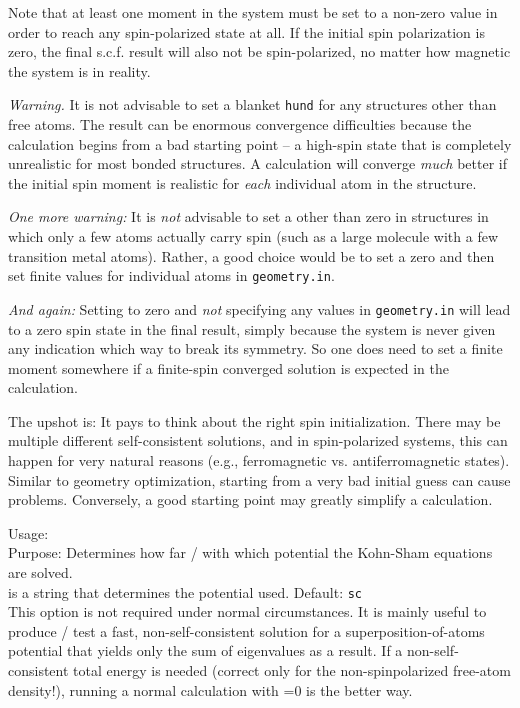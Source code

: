 Note that at least one moment in the system must be set to a non-zero value in
order to reach any spin-polarized state at all. If the initial spin
polarization is zero, the final s.c.f. result will also not be spin-polarized,
no matter how magnetic the system is in reality.

\emph{Warning.} It is not advisable to set a blanket
 \texttt{hund} for any structures
other than free atoms. The result can be enormous convergence
difficulties because the calculation begins from a bad starting point
-- a high-spin state that is completely unrealistic for most bonded
structures. A calculation will converge \emph{much} better if the
initial spin moment is realistic for \emph{each} individual atom in
the structure.

\emph{One more warning:} It is \emph{not} advisable to set a
 other than zero in structures in
which only a few atoms actually carry spin (such as a large molecule
with a few transition metal atoms). Rather, a good choice would be to
set a zero  and
then set finite  values for individual atoms in
\texttt{geometry.in}.

\emph{And again:} Setting
 to zero and \emph{not} specifying
any  values in \texttt{geometry.in} will lead
to a zero spin state in the final result, simply because the system is
never given any indication which way to break its symmetry. So one does
need to set a finite moment somewhere if a finite-spin converged
solution is expected in the calculation.

The upshot is: It pays to think about the right spin
initialization. There may be multiple different
self-consistent solutions, and in spin-polarized systems, this can
happen for very natural reasons  (e.g., ferromagnetic
vs. antiferromagnetic states). Similar to geometry optimization,
starting from a very bad initial guess can cause
problems. Conversely, a good starting point may greatly simplify a
calculation.

{
  \noindent
  Usage:   \\[1.0ex]
  Purpose: Determines how far / with which potential the Kohn-Sham
    equations are solved. \\[1.0ex]
   is a string that determines the potential
    used. Default: \texttt{sc} \\
}
This option is not required under normal circumstances. It is mainly
useful to produce / test a fast, non-self-consistent solution for a
superposition-of-atoms potential that yields only the sum of
eigenvalues as a result. If a non-self-consistent total energy is
needed (correct only for the non-spinpolarized free-atom density!),
running a normal calculation with =0 is the
better way.

